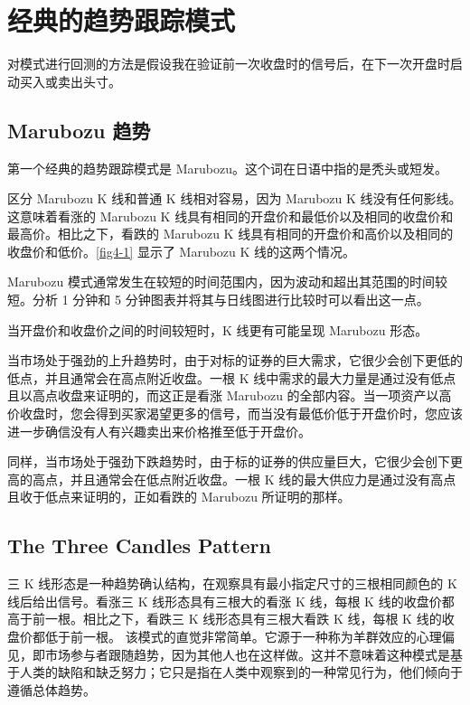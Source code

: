 \chapter{经典的趋势跟踪模式}
\begin{tcolorbox}
    对模式进行回测的方法是假设我在验证前一次收盘时的信号后，在下一次开盘时启动买入或卖出头寸。
\end{tcolorbox}
\section{Marubozu 趋势}
第一个经典的趋势跟踪模式是 Marubozu。这个词在日语中指的是秃头或短发。

区分 Marubozu K 线和普通 K 线相对容易，因为 Marubozu K 线没有任何影线。这意味着看涨的 Marubozu K 线具有相同的开盘价和最低价以及相同的收盘价和最高价。相比之下，看跌的 Marubozu K 线具有相同的开盘价和高价以及相同的收盘价和低价。\autoref{fig4-1} 显示了 Marubozu K 线的这两个情况。


Marubozu 模式通常发生在较短的时间范围内，因为波动和超出其范围的时间较短。分析 1 分钟和 5 分钟图表并将其与日线图进行比较时可以看出这一点。
\begin{tcolorbox}
    当开盘价和收盘价之间的时间较短时，K 线更有可能呈现 Marubozu 形态。
\end{tcolorbox}

当市场处于强劲的上升趋势时，由于对标的证券的巨大需求，它很少会创下更低的低点，并且通常会在高点附近收盘。一根 K 线中需求的最大力量是通过没有低点且以高点收盘来证明的，而这正是看涨 Marubozu 的全部内容。当一项资产以高价收盘时，您会得到买家渴望更多的信号，而当没有最低价低于开盘价时，您应该进一步确信没有人有兴趣卖出来价格推至低于开盘价。

同样，当市场处于强劲下跌趋势时，由于标的证券的供应量巨大，它很少会创下更高的高点，并且通常会在低点附近收盘。一根 K 线的最大供应力是通过没有高点且收于低点来证明的，正如看跌的 Marubozu 所证明的那样。
\section{The Three Candles Pattern}
三 K 线形态是一种趋势确认结构，在观察具有最小指定尺寸的三根相同颜色的 K 线后给出信号。看涨三 K 线形态具有三根大的看涨 K 线，每根 K 线的收盘价都高于前一根。相比之下，看跌三 K 线形态具有三根大看跌 K 线，每根 K 线的收盘价都低于前一根。
该模式的直觉非常简单。它源于一种称为羊群效应的心理偏见，即市场参与者跟随趋势，因为其他人也在这样做。这并不意味着这种模式是基于人类的缺陷和缺乏努力；它只是指在人类中观察到的一种常见行为，他们倾向于遵循总体趋势。


